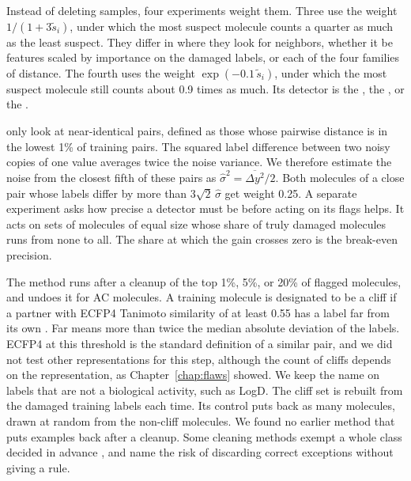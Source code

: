 Instead of deleting samples, four experiments weight them. Three use the weight $1/(1 + 3\tilde s_i)$, under which the most suspect molecule counts a quarter as much as the least suspect. They differ in where they look for neighbors, whether it be features scaled by importance on the damaged labels, or each of the four families of distance. The fourth uses the weight $\exp(-0.1\,\tilde s_i)$, under which the most suspect molecule still counts about 0.9 times as much. Its detector is the , the , or the .

 only look at near-identical pairs, defined as those whose pairwise distance is in the lowest 1\% of training pairs. The squared label difference between two noisy copies of one value averages twice the noise variance. We therefore estimate the noise from the closest fifth of these pairs as $\hat\sigma^2 = \overline{\Delta y^2}/2$. Both molecules of a close pair whose labels differ by more than $3\sqrt{2}\,\hat\sigma$ get weight 0.25. A separate experiment asks how precise a detector must be before acting on its flags helps. It acts on sets of molecules of equal size whose share of truly damaged molecules runs from none to all. The share at which the gain crosses zero is the break-even precision.

The  method runs after a cleanup of the top 1\%, 5\%, or 20\% of flagged molecules, and undoes it for AC molecules. A training molecule is designated to be a cliff if a partner with ECFP4 Tanimoto similarity of at least 0.55 \citep{Hu2015} has a label far from its own \citep{Maggiora2006, Stumpfe2012}. Far means more than twice the median absolute deviation of the labels. ECFP4 at this threshold is the standard definition of a similar pair, and we did not test other representations for this step, although the count of cliffs depends on the representation, as Chapter~\ref{chap:flaws} showed. We keep the name on labels that are not a biological activity, such as LogD. The cliff set is rebuilt from the damaged training labels each time. Its control puts back as many molecules, drawn at random from the non-cliff molecules. We found no earlier method that puts examples back after a cleanup. Some cleaning methods exempt a whole class decided in advance \citep{Kubat1997, Stefanowski2008}, and \citet{Brodley1999} name the risk of discarding correct exceptions without giving a rule.

